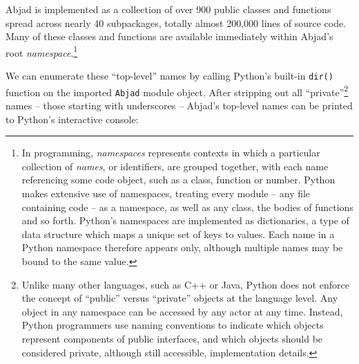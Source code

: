 \noindent Abjad is implemented as a collection of over 900 public classes and
functions spread across nearly 40 subpackages, totally almost 200,000 lines of
source code. Many of these classes and functions are available immediately
within Abjad's root \emph{namespace}.\footnote{In programming, \emph{namespaces}
represents contexts in which a particular collection of \emph{names}, or
identifiers, are grouped together, with each name referencing some code object,
such as a class, function or number. Python makes extensive use of namespaces,
treating every module -- any file containing code -- as a namespace, as well as
any class, the bodies of functions and so forth. Python's namespaces are
implemented as dictionaries, a type of data structure which maps a unique set
of keys to values. Each name in a Python namespace therefore appears only,
although multiple names may be bound to the same value.}

We can enumerate these \enquote{top-level} names by calling Python's built-in
\texttt{dir()} function on the imported \texttt{Abjad} module object. After
stripping out all \enquote{private}\footnote{ Unlike many other languages, such
as C++ or Java, Python does not enforce the concept of \enquote{public} versus
\enquote{private} objects at the language level. Any object in any namespace
can be accessed by any actor at any time. Instead, Python programmers use
naming conventions to indicate which objects represent components of public
interfaces, and which objects should be considered private, although still
accessible, implementation details.} names -- those starting with underscores
-- Abjad's top-level names can be printed to Python's interactive console:

\begin{comment}
<abjad>[text_width=105]
abjad_names = dir(abjad)
abjad_names = [x for x in abjad_names if not x.startswith('_')]
print(abjad_names)
</abjad>
\end{comment}

